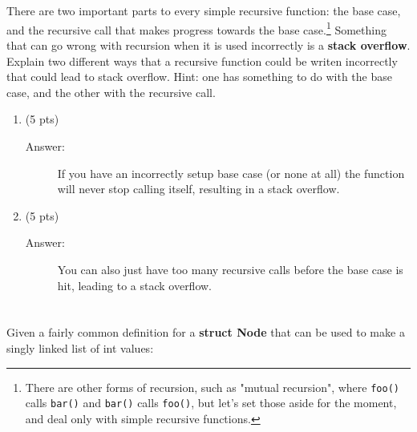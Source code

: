 \documentclass[11pt]{article}
\begin{document}
\section{}
\label{sec:orgdfdbaaf}
There are two important parts to every simple recursive function: the base
case, and the recursive call that makes progress towards the base
case.\footnote{There are other forms of recursion, such as "mutual recursion", where
\texttt{foo()} calls \texttt{bar()} and \texttt{bar()} calls \texttt{foo()}, but let's set those aside for
the moment, and deal only with simple recursive functions.} Something that can
go wrong with recursion when it is used incorrectly is a \textbf{stack
overflow}. Explain two different ways that a recursive function could be writen
incorrectly that could lead to stack overflow. Hint: one has something to do
with the base case, and the other with the recursive call.
\begin{enumerate}
\item (5 pts)

\begin{description}
  \item[Answer:] If you have an incorrectly setup base case (or none at all) the function will never stop calling itself, resulting in a stack overflow.
\end{description}

\item (5 pts)

\begin{description}
  \item[Answer:] You can also just have too many recursive calls before the base case is hit, leading to a stack overflow.
\end{description}
\end{enumerate}

\newpage

\section{}
\label{sec:org79a0610}
Given a fairly common definition for a \textbf{struct Node} that can be used to make
a singly linked list of int values:
\end{document}
